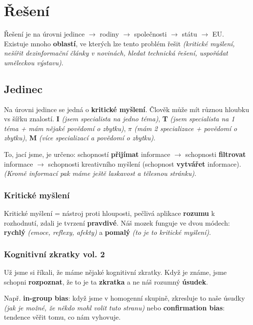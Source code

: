 \section{Řešení}

Řešení je na úrovni jedince $\to$ rodiny $\to$ společnosti $\to$ státu $\to$ EU. Existuje mnoho \textbf{oblastí}, ve kterých lze tento problém řešit \textit{(kritické myšlení, nešířit dezinformační články v novinách, hledat technická řešení, uspořádat uměleckou výstavu)}.

\subsection{Jedinec}

Na úrovni jedince se jedná o \textbf{kritické myšlení}. Člověk může mít různou hloubku vs šířku znalostí. \textbf{I} \textit{(jsem specialista na jedno téma)}, \textbf{T} \textit{(jsem specialista na 1 téma + mám nějaké povědomí o zbytku)}, $\pi$ \textit{(mám 2 specializace + povědomí o zbytku)}, \textbf{M} \textit{(více specializací a povědomí o zbytku)}.

To, jací jsme, je určeno: schopností \textbf{přijímat} informace $\to$ schopnosti \textbf{filtrovat} informace $\to$ schopnosti kreativního myšlení (schopnost \textbf{vytvářet} informace). \textit{(Kromě informací pak máme ještě laskavost a tělesnou stránku)}.

\subsubsection*{Kritické myšlení}

Kritické myšlení = nástroj proti hlouposti, pečlivá aplikace \textbf{rozumu} k rozhodnutí, zdali je tvrzení \textbf{pravdivé}. Náš mozek funguje ve dvou módech: \textbf{rychlý} \textit{(emoce, reflexy, afekty)} a \textbf{pomalý} \textit{(to je to kritické myšlení)}.

\subsubsection*{Kognitivní zkratky vol. 2}

Už jsme si říkali, že máme nějaké kognitivní zkratky. Když je známe, jsme schopni \textbf{rozpoznat}, že to je ta \textbf{zkratka} a ne náš rozumný \textbf{úsudek}.

Např. \textbf{in-group bias}: když jsme v homogenní skupině, zkresluje to naše úsudky \textit{(jak je možné, že někdo mohl volit tuto stranu)} nebo \textbf{confirmation bias}: tendence věřit tomu, co nám vyhovuje.

